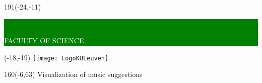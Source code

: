 \documentclass[12pt,a4paper,oneside]{book}
\begin{document}

\thispagestyle{empty}
\newcommand{\form}[1]{\scalebox{1.087}{\boldmath{#1}}}
\sffamily
%
\begin{textblock}{191}(-24,-11)
	\colorbox{green}{\hspace{139mm}\ \parbox[c][18truemm]{52mm}{\textcolor{white}{FACULTY OF SCIENCE}}}
\end{textblock}
%
\begin{textblock}{70}(-18,-19)
	\textblockcolour{}
	\texttt{[image: LogoKULeuven]}
\end{textblock}
%
\begin{textblock}{160}(-6,63)
	\textblockcolour{}
	\vspace{-\parskip}
	\flushleft
	\fontsize{40}{42}\selectfont \textcolor{bluetitle}{Visualization of music suggestions}\\[1.5mm]
	\fontsize{20}{22}\selectfont {A visual explanation system for collaborative filtering}
\end{textblock}
\end{document}
